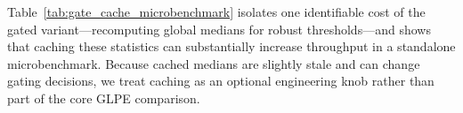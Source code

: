 Table~\ref{tab:gate_cache_microbenchmark} isolates one identifiable cost of the gated variant---recomputing global medians for robust thresholds---and shows that caching these statistics can substantially increase throughput in a standalone microbenchmark.
Because cached medians are slightly stale and can change gating decisions, we treat caching as an optional engineering knob rather than part of the core GLPE comparison.


